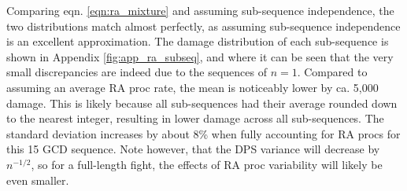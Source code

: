 Comparing eqn. \ref{eqn:ra_mixture} and assuming sub-sequence independence, the two distributions match almost perfectly, as assuming sub-sequence independence is an excellent approximation. The damage distribution of each sub-sequence is shown in Appendix \ref{fig:app_ra_subseq}, and where it can be seen that the very small discrepancies are indeed due to the sequences of $n=1$. Compared to assuming an average RA proc rate, the mean is noticeably lower by ca. 5,000 damage. This is likely because all sub-sequences had their average rounded down to the nearest integer, resulting in lower damage across all sub-sequences. The standard deviation increases by about 8\% when fully accounting for RA procs for this 15 GCD sequence. Note however, that the DPS variance will decrease by $n^{-1/2}$, so for a full-length fight, the effects of RA proc variability will likely be even smaller.



